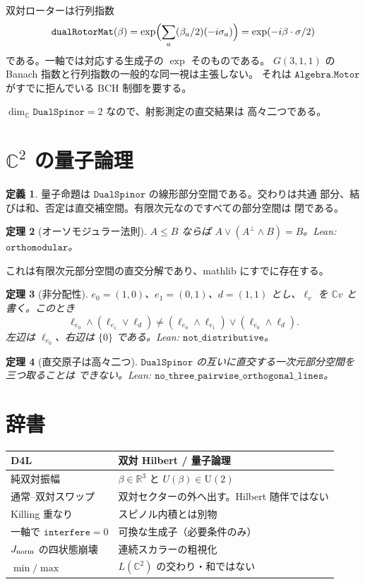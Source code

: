 \documentclass[dvipdfmx,11pt,a4paper]{jsarticle}
\newtheorem{theorem}{定理}[section]
\theoremstyle{definition}
\newtheorem{definition}[theorem]{定義}
\theoremstyle{remark}
\newcommand{\Jnorm}{J_{\rm norm}}
\begin{document}
双対ローターは行列指数
\[
\texttt{dualRotorMat}(\beta)
=\exp\Bigl(\sum_a(\beta_a/2)(-i\sigma_a)\Bigr)
=\exp(-i\beta\cdot\sigma/2)
\]
である。一軸では対応する生成子の $\exp$ そのものである。
$G(3,1,1)$ の Banach 指数と行列指数の一般的な同一視は主張しない。
それは $\texttt{Algebra.Motor}$ がすでに拒んでいる BCH 制御を要する。

$\dim_{\mathbb{C}}\texttt{DualSpinor}=2$ なので、射影測定の直交結果は
高々二つである。

\section{$\mathbb{C}^2$ の量子論理}
\label{sec:ql}

\begin{definition}
量子命題は $\texttt{DualSpinor}$ の線形部分空間である。交わりは共通
部分、結びは和、否定は直交補空間。有限次元なのですべての部分空間は
閉である。
\end{definition}

\begin{theorem}[オーソモジュラー法則]
\label{thm:om}
$A\le B$ ならば $A\vee(A^\perp\wedge B)=B$。Lean:
$\texttt{orthomodular}$。
\end{theorem}

これは有限次元部分空間の直交分解であり、mathlib にすでに存在する。

\begin{theorem}[非分配性]
\label{thm:ndist}
$e_0=(1,0)$、$e_1=(0,1)$、$d=(1,1)$ とし、$\ell_v$ を $\mathbb{C}v$
と書く。このとき
\[
\ell_{e_0}\wedge(\ell_{e_1}\vee\ell_d)
\neq
(\ell_{e_0}\wedge\ell_{e_1})\vee(\ell_{e_0}\wedge\ell_d).
\]
左辺は $\ell_{e_0}$、右辺は $\{0\}$ である。Lean:
$\texttt{not\_distributive}$。
\end{theorem}

\begin{theorem}[直交原子は高々二つ]
\label{thm:two}
$\texttt{DualSpinor}$ の互いに直交する一次元部分空間を三つ取ることは
できない。Lean: $\texttt{no\_three\_pairwise\_orthogonal\_lines}$。
\end{theorem}

\section{辞書}
\label{sec:dict}

\begin{center}
\begin{tabular}{@{}ll@{}}
\toprule
D4L & 双対 Hilbert / 量子論理 \\
\midrule
純双対振幅 & $\beta\in\mathbb{R}^3$ と $U(\beta)\in\mathrm{U}(2)$ \\
通常--双対スワップ & 双対セクターの外へ出す。Hilbert 随伴ではない \\
Killing 重なり & スピノル内積とは別物 \\
一軸で $\texttt{interfere}=0$ & 可換な生成子（必要条件のみ） \\
$\Jnorm$ の四状態崩壊 & 連続スカラーの粗視化 \\
$\min/\max$ & $L(\mathbb{C}^2)$ の交わり・和ではない \\
\bottomrule
\end{tabular}
\end{center}
\end{document}

